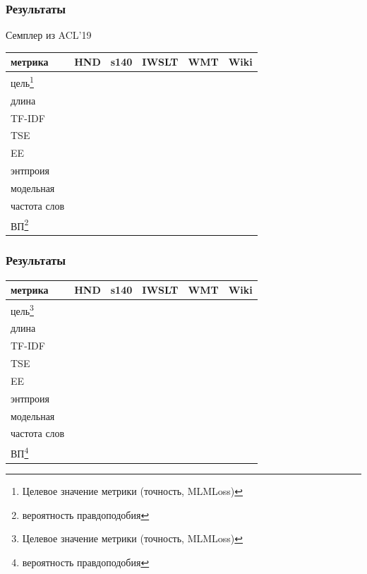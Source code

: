 \documentclass{beamer}
\begin{document}
\begin{frame}
	\frametitle{Результаты}
	Семплер из ACL'19
	\begin{table}
		\begin{tabular}{l|cc|cc|c}
			метрика & HND & s140 & IWSLT & WMT & Wiki \\
			\hline
			цель\footnote[1]{Целевое значение метрики (точность, MLMLoss)} &&&&&\\
			\hline
			длина &&&&& \\
			TF-IDF &&&&& \\
			TSE &&&&& \\
			EE &&&&& \\
			энтпроия &&&&& \\
			модельная &&&&& \\
			частота слов &&&&& \\
			ВП\footnote[2]{вероятность правдоподобия} &&&&& \\
			\hline
		\end{tabular}
	\end{table}
\end{frame}

\begin{frame}
	\frametitle{Результаты}
	\begin{table}
		\begin{tabular}{l|cc|cc|c}
			метрика & HND & s140 & IWSLT & WMT & Wiki \\
			\hline
			цель\footnote[1]{Целевое значение метрики (точность, MLMLoss)} &&&&&\\
			\hline
			длина &&&&& \\
			TF-IDF &&&&& \\
			TSE &&&&& \\
			EE &&&&& \\
			энтпроия &&&&& \\
			модельная &&&&& \\
			частота слов &&&&& \\
			ВП\footnote[2]{вероятность правдоподобия} &&&&& \\
			\hline
		\end{tabular}
	\end{table}
\end{frame}
\end{document}
